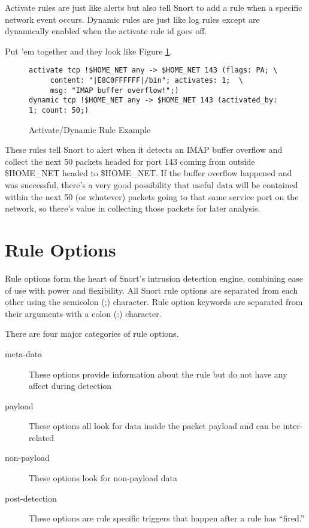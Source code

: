 \documentclass[english]{report}
\begin{document}
Activate rules are just like alerts but also tell Snort to add a rule
when a specific network event occurs. Dynamic rules are just like
log rules except are dynamically enabled when the activate rule id
goes off. 

Put 'em together and they look like Figure \ref{activate/dynamic rule example}.

%
\begin{figure}[!hbpt]
\begin{verbatim}
activate tcp !$HOME_NET any -> $HOME_NET 143 (flags: PA; \
     content: "|E8C0FFFFFF|/bin"; activates: 1;  \
     msg: "IMAP buffer overflow!";)
dynamic tcp !$HOME_NET any -> $HOME_NET 143 (activated_by: 1; count: 50;)
\end{verbatim}

\caption{Activate/Dynamic Rule Example\label{activate/dynamic rule example}}
\end{figure}

These rules tell Snort to alert when it detects an IMAP buffer overflow
and collect the next 50 packets headed for port 143 coming from outside
\$HOME\_NET headed to \$HOME\_NET. If the buffer overflow happened
and was successful, there's a very good possibility that useful data
will be contained within the next 50 (or whatever) packets going to
that same service port on the network, so there's value in collecting
those packets for later analysis.

\newpage
\section{Rule Options}

Rule options form the heart of Snort's intrusion detection engine, combining
ease of use with power and flexibility. All Snort rule options are separated
from each other using the semicolon (;) character. Rule option keywords are
separated from their arguments with a colon (:) character. 

There are four major categories of rule options.  
\begin{description}
\item [meta-data] These options provide information about the rule but do not have any affect during detection 
\item [payload] These options all look for data inside the packet payload and can be inter-related
\item [non-payload] These options look for non-payload data
\item [post-detection] These options are rule specific triggers that happen after a rule has ``fired.''
\end{description}
\end{document}

